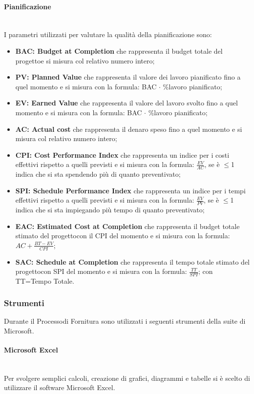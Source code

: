 \paragraph*{Pianificazione}\mbox{}\\ [1mm]
I parametri utilizzati per valutare la qualità della pianificazione sono:
\begin{itemize}
\item \textbf{BAC: Budget at Completion} che rappresenta il budget totale del progetto\glosp e si misura col relativo numero intero;
\item \textbf{PV: Planned Value} che rappresenta il valore dei lavoro pianificato fino a quel momento e si misura con la formula: BAC $\cdot$ \%lavoro pianificato;
\item \textbf{EV: Earned Value} che rappresenta il valore del lavoro svolto fino a quel momento e si misura con la formula: BAC $\cdot$ \%lavoro pianificato;
\item \textbf{AC: Actual cost} che rappresenta il denaro speso fino a quel momento e si misura col relativo numero intero;
\item \textbf{CPI: Cost Performance Index} che rappresenta un indice per i costi effettivi rispetto a quelli previsti e si misura con la formula: $\frac{EV}{AC}$, se è $\le$1 indica che si sta spendendo più di quanto preventivato;
\item \textbf{SPI: Schedule Performance Index} che rappresenta un indice per i tempi effettivi rispetto a quelli previsti e si misura con la formula: $\frac{EV}{PV}$, se è $\le$1 indica che si sta impiegando più tempo di quanto preventivato;
\item \textbf{EAC: Estimated Cost at Completion} che rappresenta il budget totale stimato del progetto\glosp con il CPI del momento e si misura con la formula: $AC+\frac{BT-EV}{CPI}$;
\item \textbf{SAC: Schedule at Completion} che rappresenta il tempo totale stimato del progetto\glosp con SPI del momento e si misura con la formula: $\frac{TT}{SPI}$; con TT=Tempo Totale.
\end{itemize}
\subsubsection{Strumenti}
Durante il Processo\glosp di Fornitura sono utilizzati i seguenti strumenti della suite di Microsoft.
\paragraph{Microsoft Excel}\mbox{}\\ [1mm]
Per svolgere semplici calcoli, creazione di grafici, diagrammi e tabelle si è scelto di utilizzare il software Microsoft Excel.
